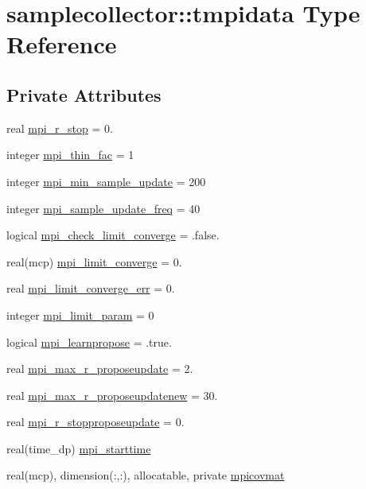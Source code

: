 \hypertarget{structsamplecollector_1_1tmpidata}{}\section{samplecollector\+:\+:tmpidata Type Reference}
\label{structsamplecollector_1_1tmpidata}
\subsection*{Private Attributes}
\begin{DoxyCompactItemize}
\item 
real \mbox{\hyperlink{structsamplecollector_1_1tmpidata_a6afa12026b35f4aa5970a124077b437f}{mpi\+\_\+r\+\_\+stop}} = 0.
\item 
integer \mbox{\hyperlink{structsamplecollector_1_1tmpidata_a8ac0f621273b186cfe01b7bacfdf05dc}{mpi\+\_\+thin\+\_\+fac}} = 1
\item 
integer \mbox{\hyperlink{structsamplecollector_1_1tmpidata_a212e9aa433676f708e88a7fe30dc42a1}{mpi\+\_\+min\+\_\+sample\+\_\+update}} = 200
\item 
integer \mbox{\hyperlink{structsamplecollector_1_1tmpidata_af54787e3e1a0524d8a22cb3fa0f71297}{mpi\+\_\+sample\+\_\+update\+\_\+freq}} = 40
\item 
logical \mbox{\hyperlink{structsamplecollector_1_1tmpidata_a766db3195422dfadd0de4609ff3da6b5}{mpi\+\_\+check\+\_\+limit\+\_\+converge}} = .false.
\item 
real(mcp) \mbox{\hyperlink{structsamplecollector_1_1tmpidata_a06b52807c438e5dc94bc1d25101b6869}{mpi\+\_\+limit\+\_\+converge}} = 0.
\item 
real \mbox{\hyperlink{structsamplecollector_1_1tmpidata_ab8ce066618f4a9daafcefa89499c01ff}{mpi\+\_\+limit\+\_\+converge\+\_\+err}} = 0.
\item 
integer \mbox{\hyperlink{structsamplecollector_1_1tmpidata_a9be7e31021538a058dff2f05d49668df}{mpi\+\_\+limit\+\_\+param}} = 0
\item 
logical \mbox{\hyperlink{structsamplecollector_1_1tmpidata_a1e3e21351130606c006daaa8981dd53b}{mpi\+\_\+learnpropose}} = .true.
\item 
real \mbox{\hyperlink{structsamplecollector_1_1tmpidata_a7c47c6573aae6b15e504dc2761f043ed}{mpi\+\_\+max\+\_\+r\+\_\+proposeupdate}} = 2.
\item 
real \mbox{\hyperlink{structsamplecollector_1_1tmpidata_af5092a00ec85a8f829192faa7263f5cf}{mpi\+\_\+max\+\_\+r\+\_\+proposeupdatenew}} = 30.
\item 
real \mbox{\hyperlink{structsamplecollector_1_1tmpidata_a12d69d16ef38b19163657cc212a64322}{mpi\+\_\+r\+\_\+stopproposeupdate}} = 0.
\item 
real(time\+\_\+dp) \mbox{\hyperlink{structsamplecollector_1_1tmpidata_a8da1b17cd37625abb2221fcb1b1aa455}{mpi\+\_\+starttime}}
\item 
real(mcp), dimension(\+:,\+:), allocatable, private \mbox{\hyperlink{structsamplecollector_1_1tmpidata_a20e39ef16f167717c444c0c6fc62d999}{mpicovmat}}
\end{DoxyCompactItemize}


